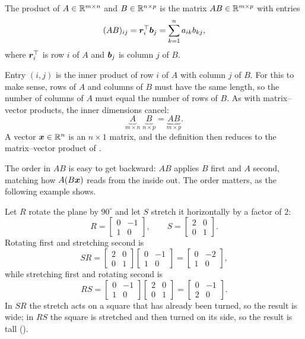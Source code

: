\begin{definition}
  \label{def:matmul}
  The product of $A \in \mathbb{R}^{m \times n}$ and $B \in \mathbb{R}^{n \times p}$ is the
  matrix $AB \in \mathbb{R}^{m \times p}$ with entries
  \[
    (AB)_{ij} = \bm{r}_i^\top \bm{b}_j = \sum_{k=1}^n a_{ik} b_{kj} ,
  \]
  where $\bm{r}_i^\top$ is row $i$ of $A$ and $\bm{b}_j$ is column $j$
  of $B$.
\end{definition}

Entry $(i, j)$ is the inner product of row $i$ of $A$ with column $j$ of
$B$. For this to make sense, rows of $A$ and columns of $B$ must have the
same length, so the number of columns of $A$ must equal the number of
rows of $B$. As with matrix--vector products, the inner dimensions
cancel:
\[
  \underbrace{A}_{m \times n} \; \underbrace{B}_{n \times p}
  = \underbrace{AB}_{m \times p} .
\]
A vector $\bm{x} \in \mathbb{R}^n$ is an $n \times 1$ matrix, and the definition
then reduces to the matrix--vector product of .

The order in $AB$ is easy to get backward: $AB$ applies $B$ first and $A$
second, matching how $A(B\bm{x})$ reads from the inside out. The order
matters, as the following example shows.

\begin{example}
  \label{ex:ch03-noncommute}
  Let $R$ rotate the plane by $90^\circ$ and let $S$ stretch it
  horizontally by a factor of $2$:
  \[
    R = \begin{bmatrix} 0 & -1 \\ 1 & 0 \end{bmatrix}, \qquad
    S = \begin{bmatrix} 2 & 0 \\ 0 & 1 \end{bmatrix}.
  \]
  Rotating first and stretching second is
  \[
    SR = \begin{bmatrix} 2 & 0 \\ 0 & 1 \end{bmatrix}
         \begin{bmatrix} 0 & -1 \\ 1 & 0 \end{bmatrix}
       = \begin{bmatrix} 0 & -2 \\ 1 & 0 \end{bmatrix},
  \]
  while stretching first and rotating second is
  \[
    RS = \begin{bmatrix} 0 & -1 \\ 1 & 0 \end{bmatrix}
         \begin{bmatrix} 2 & 0 \\ 0 & 1 \end{bmatrix}
       = \begin{bmatrix} 0 & -1 \\ 2 & 0 \end{bmatrix}.
  \]
  In $SR$ the stretch acts on a square that has already been turned, so
  the result is wide; in $RS$ the square is stretched and then turned on
  its side, so the result is tall ().
\end{example}

